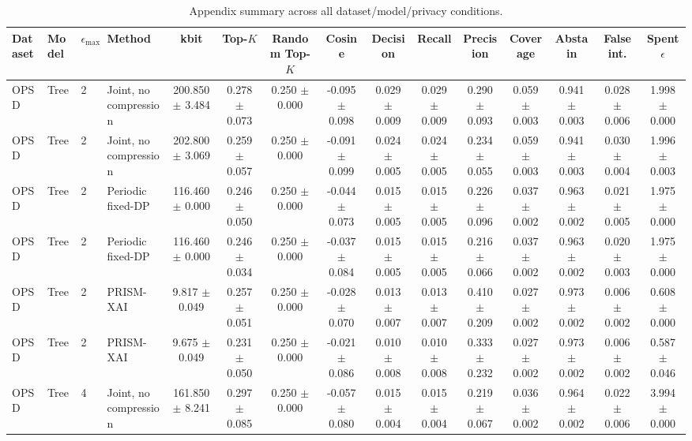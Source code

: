\begin{table}[t]
\caption{Appendix summary across all dataset/model/privacy conditions.}
\label{tab:appendix-conditions}
\centering
\scriptsize
\setlength{\tabcolsep}{2.5pt}
\begin{tabular}{llllccccccccccc}
\toprule
Dataset & Model & $\epsilon_{\max}$ & Method & kbit & Top-$K$ & Random Top-$K$ & Cosine & Decision & Recall & Precision & Coverage & Abstain & False int. & Spent $\epsilon$ \\
\midrule
OPSD & Tree & 2 & Joint, no compression & 200.850 $\pm$ 3.484 & 0.278 $\pm$ 0.073 & 0.250 $\pm$ 0.000 & -0.095 $\pm$ 0.098 & 0.029 $\pm$ 0.009 & 0.029 $\pm$ 0.009 & 0.290 $\pm$ 0.093 & 0.059 $\pm$ 0.003 & 0.941 $\pm$ 0.003 & 0.028 $\pm$ 0.006 & 1.998 $\pm$ 0.000 \\
OPSD & Tree & 2 & Joint, no compression & 202.800 $\pm$ 3.069 & 0.259 $\pm$ 0.057 & 0.250 $\pm$ 0.000 & -0.091 $\pm$ 0.099 & 0.024 $\pm$ 0.005 & 0.024 $\pm$ 0.005 & 0.234 $\pm$ 0.055 & 0.059 $\pm$ 0.003 & 0.941 $\pm$ 0.003 & 0.030 $\pm$ 0.004 & 1.996 $\pm$ 0.003 \\
OPSD & Tree & 2 & Periodic fixed-DP & 116.460 $\pm$ 0.000 & 0.246 $\pm$ 0.050 & 0.250 $\pm$ 0.000 & -0.044 $\pm$ 0.073 & 0.015 $\pm$ 0.005 & 0.015 $\pm$ 0.005 & 0.226 $\pm$ 0.096 & 0.037 $\pm$ 0.002 & 0.963 $\pm$ 0.002 & 0.021 $\pm$ 0.005 & 1.975 $\pm$ 0.000 \\
OPSD & Tree & 2 & Periodic fixed-DP & 116.460 $\pm$ 0.000 & 0.246 $\pm$ 0.034 & 0.250 $\pm$ 0.000 & -0.037 $\pm$ 0.084 & 0.015 $\pm$ 0.005 & 0.015 $\pm$ 0.005 & 0.216 $\pm$ 0.066 & 0.037 $\pm$ 0.002 & 0.963 $\pm$ 0.002 & 0.020 $\pm$ 0.003 & 1.975 $\pm$ 0.000 \\
OPSD & Tree & 2 & PRISM-XAI & 9.817 $\pm$ 0.049 & 0.257 $\pm$ 0.051 & 0.250 $\pm$ 0.000 & -0.028 $\pm$ 0.070 & 0.013 $\pm$ 0.007 & 0.013 $\pm$ 0.007 & 0.410 $\pm$ 0.209 & 0.027 $\pm$ 0.002 & 0.973 $\pm$ 0.002 & 0.006 $\pm$ 0.002 & 0.608 $\pm$ 0.000 \\
OPSD & Tree & 2 & PRISM-XAI & 9.675 $\pm$ 0.049 & 0.231 $\pm$ 0.050 & 0.250 $\pm$ 0.000 & -0.021 $\pm$ 0.086 & 0.010 $\pm$ 0.008 & 0.010 $\pm$ 0.008 & 0.333 $\pm$ 0.232 & 0.027 $\pm$ 0.002 & 0.973 $\pm$ 0.002 & 0.006 $\pm$ 0.002 & 0.587 $\pm$ 0.046 \\
OPSD & Tree & 4 & Joint, no compression & 161.850 $\pm$ 8.241 & 0.297 $\pm$ 0.085 & 0.250 $\pm$ 0.000 & -0.057 $\pm$ 0.080 & 0.015 $\pm$ 0.004 & 0.015 $\pm$ 0.004 & 0.219 $\pm$ 0.067 & 0.036 $\pm$ 0.002 & 0.964 $\pm$ 0.002 & 0.022 $\pm$ 0.006 & 3.994 $\pm$ 0.000 \\

\end{tabular}
\end{table}

